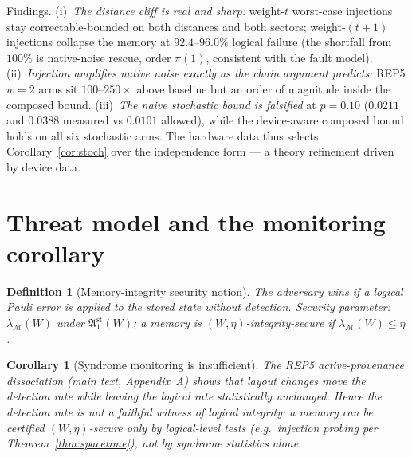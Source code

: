 \documentclass[10pt,twocolumn]{revtex4-2}
\newtheorem{definition}{Definition}
\newtheorem{corollary}{Corollary}
\begin{document}
Findings. (i)~\emph{The distance cliff is real and sharp:} weight-$t$
worst-case injections stay correctable-bounded on both distances and
both sectors; weight-$(t{+}1)$ injections collapse the memory at
$92.4$--$96.0\%$ logical failure (the shortfall from $100\%$ is
native-noise rescue, order $\pi(1)$, consistent with the fault model).
(ii)~\emph{Injection amplifies native noise exactly as the chain
argument predicts:} REP5 $w{=}2$ arms sit $100$--$250\times$ above
baseline but an order of magnitude inside the composed bound.
(iii)~\emph{The naive stochastic bound is falsified} at $p{=}0.10$
($0.0211$ and $0.0388$ measured vs $0.0101$ allowed), while the
device-aware composed bound holds on all six stochastic arms. The
hardware data thus selects Corollary~\ref{cor:stoch} over the
independence form --- a theory refinement driven by device data.

\section{Threat model and the monitoring corollary}

\begin{definition}[Memory-integrity security notion]
The adversary wins if a logical Pauli error is applied to the stored
state without detection. Security parameter: $\lambda_{\mathcal{M}}(W)$
under $\mathfrak{A}_1^{\mathrm{st}}(W)$; a memory is
\emph{$(W,\eta)$-integrity-secure} if $\lambda_{\mathcal{M}}(W)\le\eta$.
\end{definition}

\begin{corollary}[Syndrome monitoring is insufficient]\label{cor:monitor}
The REP5 active-provenance dissociation (main text, Appendix~A) shows
that layout changes move the \emph{detection rate} while leaving the
\emph{logical} rate statistically unchanged. Hence the detection rate
is not a faithful witness of logical integrity: a memory can be
certified $(W,\eta)$-secure only by logical-level tests (e.g.\
injection probing per Theorem~\ref{thm:spacetime}), not by syndrome
statistics alone.
\end{corollary}
\end{document}
